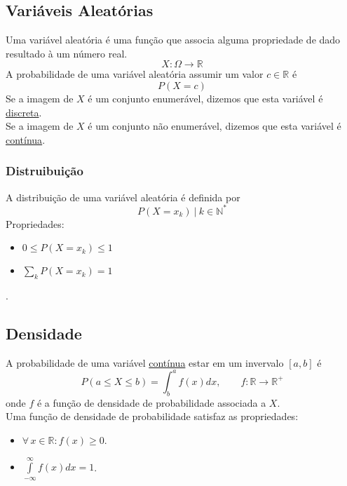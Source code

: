 \documentclass{article}
\begin{document}
\subsection{Variáveis Aleatórias}
Uma variável aleatória é uma função que associa alguma propriedade de dado resultado à um número real.
\[ X: \Omega \to \mathbb{R} \]
A probabilidade de uma variável aleatória assumir um valor $c \in \mathbb{R}$ é
\[ P(X = c) \]
Se a imagem de $X$ é um conjunto enumerável, dizemos que esta variável é \uline{discreta}. \\[5pt]
Se a imagem de $X$ é um conjunto não enumerável, dizemos que esta variável é \uline{contínua}. \\[5pt]

\subsubsection{Distruibuição}
A distribuição de uma variável aleatória é definida por
\[ P(X = x_k) \:\big|\: k \in \mathbb{N}^* \]
Propriedades:
\begin{itemize}
  \item $0 \leq P(X = x_k) \leq 1$
  \item $\sum\limits_k P(X = x_k) = 1$
\end{itemize}
.


\subsection{Densidade}
A probabilidade de uma variável \uline{contínua} estar em um invervalo $[a,b]$ é
\[ P(a \leq X \leq b) = \int_b^a f(x) dx, \qquad f: \mathbb{R} \to \mathbb{R}^+ \]
onde $f$ é a função de densidade de probabilidade associada a $X$. \\[10pt]
Uma função de densidade de probabilidade satisfaz as propriedades:
\begin{itemize}
  \item $\forall\, x \in \mathbb{R}: f(x) \geq 0$.
  \item $\int\limits_{-\infty}^{\infty} f(x) dx = 1$.
\end{itemize}
\end{document}
